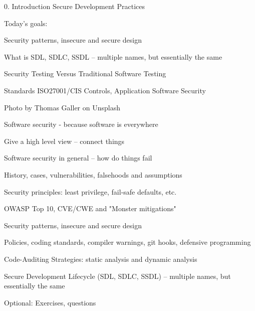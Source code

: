 \documentclass[Screen16to9,17pt]{foils}
\begin{document}
\mytitlepage
{0. Introduction}
{Secure Development Practices}

\hlkprofiluk



Today's goals:
\begin{list2}
\item Security patterns, insecure and secure design
\item What is SDL, SDLC, SSDL -- multiple names, but essentially the same
\item Security Testing Versus Traditional Software Testing
\item Standards ISO27001/CIS Controls, Application Software Security
\end{list2}

  Photo by Thomas Galler on Unsplash



\begin{list1}
\item Software security - because software is everywhere
\item Give a high level view -- connect things
\end{list1}



\begin{list2}
\item Software security in general -- how do things fail
\item History, cases, vulnerabilities, falsehoods and assumptions
\item Security principles: least privilege, fail-safe defaults, etc.
\item OWASP Top 10, CVE/CWE and "Monster mitigations"
\item Security patterns, insecure and secure design
\item Policies, coding standards, compiler warnings, git hooks, defensive programming
\item Code-Auditing Strategies: static analysis and dynamic analysis
\item Secure Development Lifecycle (SDL, SDLC, SSDL) -- multiple names, but essentially the same
\item Optional: Exercises, questions
\end{list2}
\end{document}
